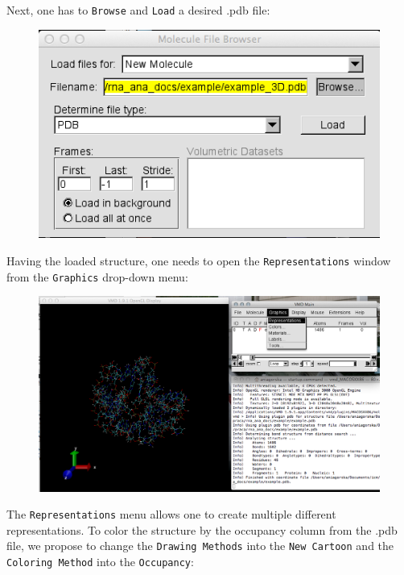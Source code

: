 \documentclass[12pt]{article}
\begin{document}
Next, one has to \texttt{Browse} and \texttt{Load} a desired .pdb file:
\begin{figure}[h!]
\centering
\includegraphics[scale=0.4]{./pictures/vmd2.png}
\end{figure}
\newpage
Having the loaded structure, one needs to open the \texttt{Representations} window from the \texttt{Graphics} drop-down menu:
\begin{figure}[h!]
\centering
\includegraphics[scale=0.4]{./pictures/vmd3.png}
\end{figure}

The \texttt{Representations} menu allows one to create multiple different representations. To color the structure by the occupancy column from the .pdb file, we propose to change the \texttt{Drawing Methods} into the \texttt{New Cartoon} and the \texttt{Coloring Method} into the \texttt{Occupancy}:
\end{document}
